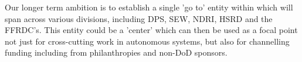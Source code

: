 \documentclass[11pt,letterpaper]{article}
\begin{document}
Our longer term ambition is to establish a single 'go to' entity
within \org which will span across various divisions, including DPS,
SEW, NDRI, HSRD and the FFRDC's. This entity could be a 'center' which
can then be used as a focal point not just for cross-cutting work in
autonomous systems, but also for channelling funding including from
philanthropies and non-DoD sponsors.
\end{document}

